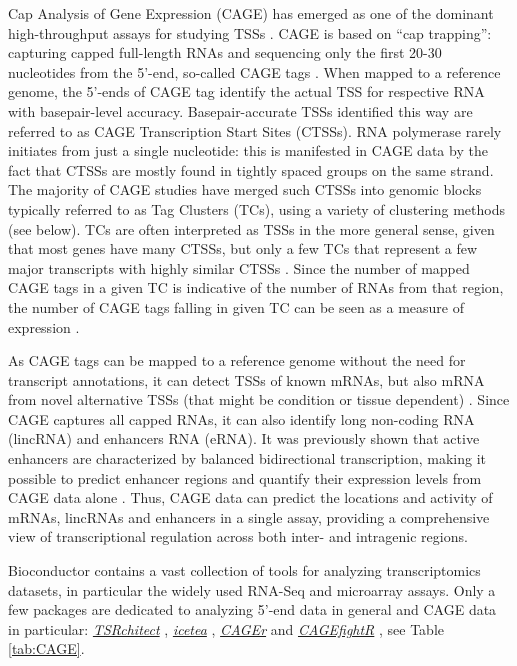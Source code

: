 \documentclass[9pt,a4paper,]{extarticle}
\begin{document}
Cap Analysis of Gene Expression (CAGE) has emerged as one of the dominant high-throughput assays for studying TSSs \citep{Adiconis2018}. CAGE is based on ``cap trapping'': capturing capped full-length RNAs and sequencing only the first 20-30 nucleotides from the 5'-end, so-called CAGE tags \citep{Mardente2005}. When mapped to a reference genome, the 5'-ends of CAGE tag identify the actual TSS for respective RNA with basepair-level accuracy. Basepair-accurate TSSs identified this way are referred to as CAGE Transcription Start Sites (CTSSs). RNA polymerase rarely initiates from just a single nucleotide: this is manifested in CAGE data by the fact that CTSSs are mostly found in tightly spaced groups on the same strand. The majority of CAGE studies have merged such CTSSs into genomic blocks typically referred to as Tag Clusters (TCs), using a variety of clustering methods (see below). TCs are often interpreted as TSSs in the more general sense, given that most genes have many CTSSs, but only a few TCs that represent a few major transcripts with highly similar CTSSs \citep{Carninci2006, Sandelin2007}. Since the number of mapped CAGE tags in a given TC is indicative of the number of RNAs from that region, the number of CAGE tags falling in given TC can be seen as a measure of expression \citep{Kawaji2014}.

As CAGE tags can be mapped to a reference genome without the need for transcript annotations, it can detect TSSs of known mRNAs, but also mRNA from novel alternative TSSs (that might be condition or tissue dependent) \citep{Carninci2006, Consortium2014}. Since CAGE captures all capped RNAs, it can also identify long non-coding RNA (lincRNA) \citep{Hon2017} and enhancers RNA (eRNA). It was previously shown that active enhancers are characterized by balanced bidirectional transcription, making it possible to predict enhancer regions and quantify their expression levels from CAGE data alone \citep{Kim2010a, Andersson2014b}. Thus, CAGE data can predict the locations and activity of mRNAs, lincRNAs and enhancers in a single assay, providing a comprehensive view of transcriptional regulation across both inter- and intragenic regions.

Bioconductor contains a vast collection of tools for analyzing transcriptomics datasets, in particular the widely used RNA-Seq and microarray assays\citep{Huber2015}. Only a few packages are dedicated to analyzing 5'-end data in general and CAGE data in particular: \emph{\href{https://bioconductor.org/packages/3.8/TSRchitect}{TSRchitect}} \citep{TaylorRaborn}, \emph{\href{https://bioconductor.org/packages/3.8/icetea}{icetea}} \citep{Bhardwaj2019}, \emph{\href{https://bioconductor.org/packages/3.8/CAGEr}{CAGEr}} \citep{Haberle2015a} and \emph{\href{https://bioconductor.org/packages/3.8/CAGEfightR}{CAGEfightR}} \citep{Thodberg2018}, see Table \ref{tab:CAGE}.
\end{document}
